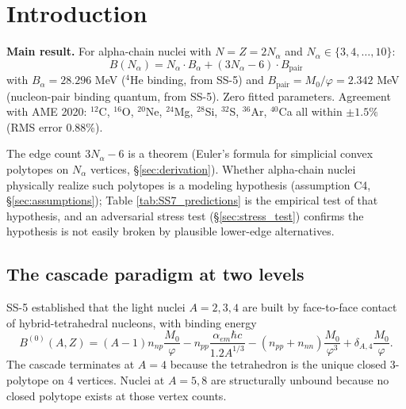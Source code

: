 \documentclass[11pt,letterpaper]{article}
\newcommand{\phig}{\varphi}
\newcommand{\Mzero}{M_0}
\newcommand{\Bpair}{B_{\mathrm{pair}}}
\newcommand{\Balpha}{B_{\alpha}}
\newcommand{\Nalpha}{N_{\alpha}}
\begin{document}
\bigskip
\raggedright
\tableofcontents
\newpage

\section{Introduction}
\label{sec:intro}

\begin{mdframed}[backgroundcolor=blue!5, linewidth=0.8pt, roundcorner=5pt]
\textbf{Main result.} For alpha-chain nuclei with $N = Z = 2\Nalpha$ and $\Nalpha \in \{3, 4, \ldots, 10\}$:
\begin{equation}
\boxed{\;B(\Nalpha) = \Nalpha \cdot \Balpha + (3\Nalpha - 6) \cdot \Bpair\;}
\label{eq:main}
\end{equation}
with $\Balpha = 28.296$ MeV (${}^4$He binding, from SS-5) and $\Bpair = \Mzero/\phig = 2.342$ MeV (nucleon-pair binding quantum, from SS-5). Zero fitted parameters. Agreement with AME 2020: ${}^{12}$C, ${}^{16}$O, ${}^{20}$Ne, ${}^{24}$Mg, ${}^{28}$Si, ${}^{32}$S, ${}^{36}$Ar, ${}^{40}$Ca all within $\pm 1.5\%$ (RMS error 0.88\%). 

The edge count $3\Nalpha - 6$ is a theorem (Euler's formula for simplicial convex polytopes on $\Nalpha$ vertices, \S\ref{sec:derivation}). Whether alpha-chain nuclei physically realize such polytopes is a modeling hypothesis (assumption C4, \S\ref{sec:assumptions}); Table \ref{tab:SS7_predictions} is the empirical test of that hypothesis, and an adversarial stress test (\S\ref{sec:stress_test}) confirms the hypothesis is not easily broken by plausible lower-edge alternatives.
\end{mdframed}

\subsection{The cascade paradigm at two levels}

SS-5 established that the light nuclei $A = 2, 3, 4$ are built by face-to-face contact of hybrid-tetrahedral nucleons, with binding energy
\begin{equation}
B^{(0)}(A, Z) = (A-1) n_{np} \frac{\Mzero}{\phig} - n_{pp} \frac{\alpha_{em}\hbar c}{1.2 A^{1/3}} - (n_{pp} + n_{nn})\frac{\Mzero}{\phig^3} + \delta_{A,4}\frac{\Mzero}{\phig}.
\label{eq:SS5}
\end{equation}
The cascade terminates at $A = 4$ because the tetrahedron is the unique closed 3-polytope on 4 vertices. Nuclei at $A = 5, 8$ are structurally unbound because no closed polytope exists at those vertex counts.
\end{document}

